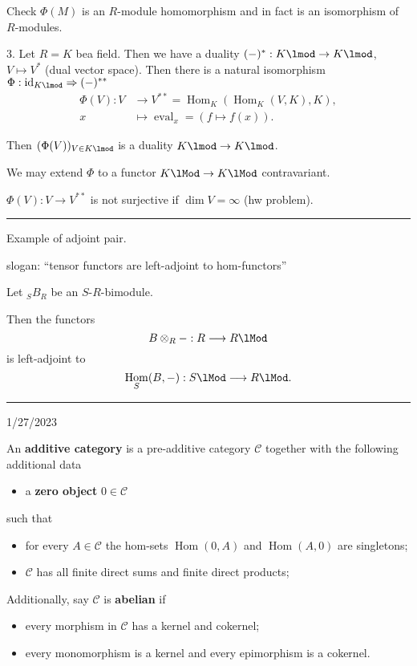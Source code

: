 \documentclass[12pt]{article}
\newcommand{\keyword}[1]{\textbf{#1}}
\newcommand{\sepline}{\rule{\textwidth}{0.4pt}}
\theoremstyle{definition}
\newcommand{\CC}{\mathcal{C}}
\newcommand{\<}{\left\langle}
\renewcommand{\>}{\right\rangle}
\newcommand{\tensor}{\otimes}
\newcommand{\To}{\longrightarrow}
\newcommand{\Mapsto}{\longmapsto}
\DeclareMathOperator{\Hom}{Hom}
\DeclareMathOperator{\id}{id}
\renewcommand{\_}[1]{{_{#1}}}
\begin{document}
Check $\Phi(M)$ is an $R$-module homomorphism and in fact is an isomorphism of $R$-modules.

3. Let $R = K$ bea field.
Then we have a duality $(-)^* : K\lmod \to K\lmod$, $V \mapsto V^*$ (dual vector space).
Then there is a natural isomorphism $\Phi : \id_{K\lmod} \Rightarrow (-)^{**}$
\begin{align*}
    \Phi(V) : V &\To V^{**} = \Hom_K(\Hom_K(V, K), K), \\
        x &\Mapsto \operatorname{eval}_x = (f \mapsto f(x)).
\end{align*}

Then $(\Phi(V))_{V \in K\lmod}$ is a duality $K\lmod \to K\lmod$.

We may extend $\Phi$ to a functor $K\lMod \to K\lMod$ contravariant.

$\Phi(V) : V \to V^{**}$ is not surjective if $\dim V = \infty$ (hw problem).

\sepline

Example of adjoint pair.

slogan: ``tensor functors are left-adjoint to hom-functors''

Let $\_SB_R$ be an $S$-$R$-bimodule.

Then the functors 
\[
    B\tensor_R - : R \To R\lMod
\]
is left-adjoint to
\[
    \Hom_S(B, -) : S\lMod \To R\lMod.
 \]

 \sepline

1/27/2023

An \keyword{additive category} is a pre-additive category $\CC$ together with the following additional data  
\begin{itemize}
    \item a \keyword{zero object} $0 \in \CC$
\end{itemize}
such that
\begin{itemize}
    \item for every $A \in \CC$ the hom-sets $\Hom(0, A)$ and $\Hom(A, 0)$ are singletons;
    \item $\CC$ has all finite direct sums and finite direct products;
\end{itemize}

Additionally, say $\CC$ is \keyword{abelian} if 
\begin{itemize}
    \item every morphism in $\CC$ has a kernel and cokernel;
    \item every monomorphism is a kernel and every epimorphism is a cokernel.
\end{itemize}
\end{document}
